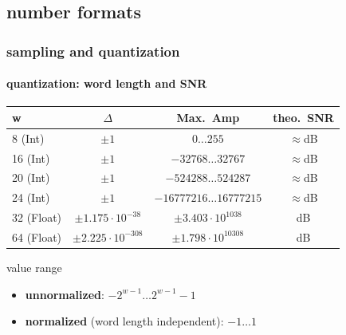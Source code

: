         \subsection{number formats} 

	\begin{frame}\frametitle{sampling and quantization}\framesubtitle{quantization: word length and SNR}
			\begin{table}
			\centering
				\begin{footnotesize}
					\begin{tabular}{lccc}
					\hline
						\textbf{w} & \textbf{$\Delta$} & \textbf{Max.\ Amp} & \textbf{theo.\ SNR} \\
					\hline
						8 (Int)	&	$\pm1$ & $0\ldots255$ & $\approx$\unit[48]{dB}\\
						16 (Int)	&	$\pm1$ & $-32768\ldots32767$ & $\approx$\unit[96]{dB}\\
						20 (Int)	&	$\pm1$ & $-524288\ldots524287$ & $\approx$\unit[120]{dB}\\
						24 (Int)	&	$\pm1$ & $-16777216\ldots16777215$ & $\approx$\unit[144]{dB}\\
					\hline
						32 (Float)	&	$\pm1.175\cdot10^{-38}$ & $\pm3.403\cdot10^{1038}$ & \unit[1529]{dB}\\
						64 (Float)	&	$\pm2.225\cdot10^{-308}$ & $\pm1.798\cdot10^{10308}$ & \unit[12318]{dB}\\
					\hline
					\end{tabular}  
				\end{footnotesize}
			\end{table}
			\pause
			value range
			\begin{itemize}
				\item	\textbf{unnormalized}: $-2^{w-1}\ldots 2^{w-1}-1$
				\item	\textbf{normalized} (word length independent): $-1\ldots 1$
			\end{itemize}
	\end{frame}	

